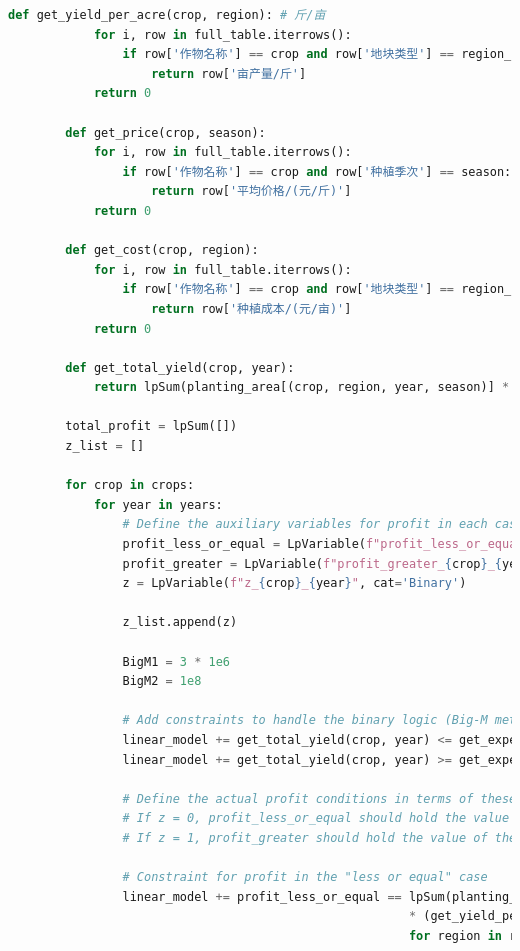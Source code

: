 \documentclass[withoutpreface]{cumcmthesis}
\begin{document}
\begin{appendices}
\begin{lstlisting}[language=python]
        def get_yield_per_acre(crop, region): # 斤/亩
            for i, row in full_table.iterrows():
                if row['作物名称'] == crop and row['地块类型'] == region_to_type[region]:
                    return row['亩产量/斤']
            return 0
        
        def get_price(crop, season):
            for i, row in full_table.iterrows():
                if row['作物名称'] == crop and row['种植季次'] == season:
                    return row['平均价格/(元/斤)']
            return 0
    
        def get_cost(crop, region):
            for i, row in full_table.iterrows():
                if row['作物名称'] == crop and row['地块类型'] == region_to_type[region]:
                    return row['种植成本/(元/亩)']
            return 0
        
        def get_total_yield(crop, year):
            return lpSum(planting_area[(crop, region, year, season)] * get_yield_per_acre(crop, region) for region in regions for season in seasons)
    
        total_profit = lpSum([])
        z_list = []
    
        for crop in crops:
            for year in years:
                # Define the auxiliary variables for profit in each case
                profit_less_or_equal = LpVariable(f"profit_less_or_equal_{crop}_{year}")
                profit_greater = LpVariable(f"profit_greater_{crop}_{year}")
                z = LpVariable(f"z_{crop}_{year}", cat='Binary')
    
                z_list.append(z)
    
                BigM1 = 3 * 1e6
                BigM2 = 1e8
    
                # Add constraints to handle the binary logic (Big-M method)
                linear_model += get_total_yield(crop, year) <= get_expected_sales(crop, '第一季') + get_expected_sales(crop, '第二季') + BigM1 * (1 - z)
                linear_model += get_total_yield(crop, year) >= get_expected_sales(crop, '第一季') + get_expected_sales(crop, '第二季') - BigM1 * z
    
                # Define the actual profit conditions in terms of these auxiliary variables
                # If z = 0, profit_less_or_equal should hold the value of the first branch
                # If z = 1, profit_greater should hold the value of the second branch
    
                # Constraint for profit in the "less or equal" case
                linear_model += profit_less_or_equal == lpSum(planting_area[(crop, region, year, season)]
                                                        * (get_yield_per_acre(crop, region) * get_price(crop, season) - get_cost(crop, region))
                                                        for region in regions for season in seasons)
    

\end{lstlisting}
\end{appendices}
\end{document}
